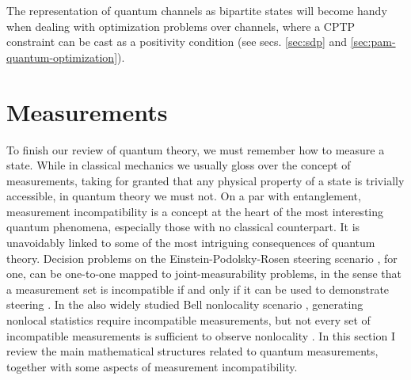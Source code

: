 		The representation of quantum channels as bipartite states will become handy when dealing with optimization problems over channels, where a CPTP constraint can be cast as a positivity condition (see secs. \ref{sec:sdp} and \ref{sec:pam-quantum-optimization}).
		

	\section{Measurements}
	\label{sec:measurements}
	
		To finish our review of quantum theory, we must remember how to measure a state. While in classical mechanics we usually gloss over the concept of measurements, taking for granted that any physical property of a state is trivially accessible, in quantum theory we must not. On a par with entanglement, measurement incompatibility is a concept at the heart of the most interesting quantum phenomena, especially those with no classical counterpart. It is unavoidably linked to some of the most intriguing consequences of quantum theory. Decision problems on the Einstein-Podolsky-Rosen steering scenario \cite{uola_2020_steering,cavalcanti_2016_steering}, for one, can be one-to-one mapped to joint-measurability problems, in the sense that a measurement set is incompatible if and only if it can be used to demonstrate steering \cite{}\todo{}. In the also widely studied Bell nonlocality scenario \cite{brunner_2014_nonlocality}, generating nonlocal statistics require incompatible measurements, but not every set of incompatible measurements is sufficient to observe nonlocality \cite{quintino_2016_incompatibilitybell,quintino_2018_incompatibilitybellgeneral,bene_2018_incompatibilitybell}. In this section I review the main mathematical structures related to quantum measurements, together with some aspects of measurement incompatibility.
	
		\ornamentbreak

